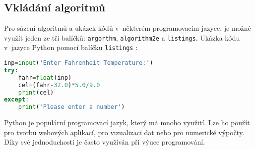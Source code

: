 \documentclass[11pt, a4paper]{article}
\begin{document}
\newpage
\subsection{Vkládání algoritmů}
Pro sázení algoritmů a ukázek kódů v~některém programovacím jazyce, je možné využít jeden ze tří balíčků: \verb|argorthm|, \verb|algorithm2e| a \verb|listings|.
Ukázka kódu v~jazyce Python pomocí balíčku \verb|listings| \cite{book:python}:

 

\begin{lstlisting}[language=Python]
inp=input('Enter Fahrenheit Temperature:')
try:
    fahr=float(inp)
    cel=(fahr-32.0)*5.0/9.0
    print(cel)
except:
    print('Please enter a number')
\end{lstlisting}

Python je populární programovací jazyk, který má mnoho využití. Lze ho použít pro tvorbu webových aplikací, pro vizualizaci dat nebo pro numerické výpočty. Díky své jednoduchosti je často využíván při výuce programování.\cite{thesis:python}


\renewcommand{\refname}{Literatura}

\end{document}
